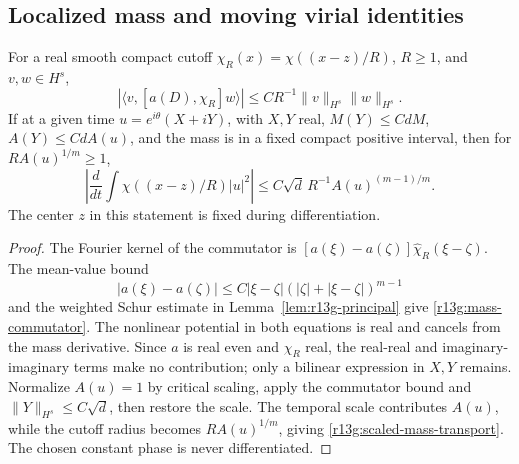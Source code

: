 \subsection{Localized mass and moving virial identities}

\begin{lemma}
\label{lem:r13g-mass-commutator}
For a real smooth compact cutoff $\chi_R(x)=\chi((x-z)/R)$,
$R\ge1$, and $v,w\in H^s$,
\begin{equation}\label{r13g:mass-commutator}
 |\langle v,[a(D),\chi_R]w\rangle|
 \le CR^{-1}\|v\|_{H^s}\|w\|_{H^s}.
\end{equation}
If at a given time $u=e^{i\theta}(X+iY)$, with $X,Y$ real,
$M(Y)\le CdM$, $A(Y)\le CdA(u)$, and the mass is in a fixed
compact positive interval, then for $R A(u)^{1/m}\ge1$,
\begin{equation}\label{r13g:scaled-mass-transport}
 \left|\frac d{dt}\int\chi((x-z)/R)|u|^2\right|
 \le C\sqrt d\,R^{-1}A(u)^{(m-1)/m}.
\end{equation}
The center $z$ in this statement is fixed during differentiation.
\end{lemma}
\begin{proof}
The Fourier kernel of the commutator is
$[a(\xi)-a(\zeta)]\widehat\chi_R(\xi-\zeta)$.
The mean-value bound
\[
 |a(\xi)-a(\zeta)|
 \le C|\xi-\zeta|(|\zeta|+|\xi-\zeta|)^{m-1}
\]
and the weighted Schur estimate in
Lemma~\ref{lem:r13g-principal} give \eqref{r13g:mass-commutator}.
The nonlinear potential in both equations is real and cancels from
the mass derivative. Since $a$ is real even and $\chi_R$ real,
the real-real and imaginary-imaginary terms make no contribution;
only a bilinear expression in $X,Y$ remains. Normalize $A(u)=1$
by critical scaling, apply the commutator bound and
$\|Y\|_{H^s}\le C\sqrt d$, then restore the scale.
The temporal scale contributes $A(u)$, while the cutoff radius becomes
$R A(u)^{1/m}$, giving \eqref{r13g:scaled-mass-transport}.
The chosen constant phase is never differentiated.
\end{proof}

